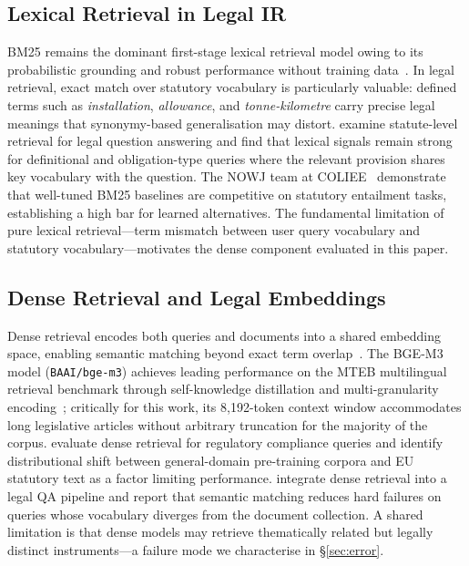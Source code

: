 \documentclass{iosart2x}
\newcommand{\bgem}{BGE-M3\xspace}
\begin{document}
\subsection{Lexical Retrieval in Legal IR}
\label{sec:related-lexical}

BM25 remains the dominant first-stage lexical retrieval model owing to
its probabilistic grounding and robust performance without training
data~\cite{robertson2009bm25}.  In legal retrieval, exact match over
statutory vocabulary is particularly valuable: defined terms such as
\textit{installation}, \textit{allowance}, and \textit{tonne-kilometre}
carry precise legal meanings that synonymy-based generalisation may
distort.  \citet{mori2023} examine statute-level retrieval for legal
question answering and find that lexical signals remain strong for
definitional and obligation-type queries where the relevant provision
shares key vocabulary with the question.  The NOWJ team at
COLIEE~\cite{nowjcoliee2023} demonstrate that well-tuned BM25 baselines
are competitive on statutory entailment tasks, establishing a high bar
for learned alternatives.  The fundamental limitation of pure lexical
retrieval---term mismatch between user query vocabulary and statutory
vocabulary---motivates the dense component evaluated in this paper.

\subsection{Dense Retrieval and Legal Embeddings}
\label{sec:related-dense}

Dense retrieval encodes both queries and documents into a shared
embedding space, enabling semantic matching beyond exact term
overlap~\cite{chen2024bgem3}.  The \bgem model (\texttt{BAAI/bge-m3})
achieves leading performance on the MTEB multilingual retrieval
benchmark through self-knowledge distillation and multi-granularity
encoding~\cite{chen2024bgem3}; critically for this work, its 8,192-token
context window accommodates long legislative articles without arbitrary
truncation for the majority of the corpus.  \citet{rayo2024} evaluate
dense retrieval for regulatory compliance queries and identify
distributional shift between general-domain pre-training corpora and
EU statutory text as a factor limiting performance.  \citet{legalrag2024}
integrate dense retrieval into a legal QA pipeline and report that
semantic matching reduces hard failures on queries whose vocabulary
diverges from the document collection.  A shared limitation is that
dense models may retrieve thematically related but legally distinct
instruments---a failure mode we characterise in \S\ref{sec:error}.
\end{document}

